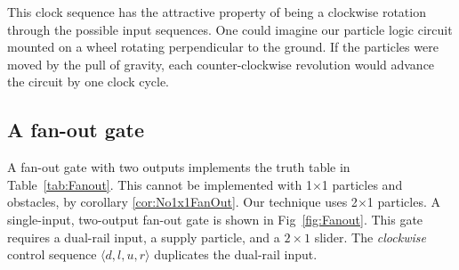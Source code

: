 \documentclass[letterpaper, 10 pt, conference]{ieeeconf}
\begin{document}
  

This clock sequence has the attractive property of being a clockwise rotation through the possible input sequences.  One could imagine our particle logic circuit mounted on a wheel rotating perpendicular to the ground. If the particles were moved by the pull of gravity, each counter-clockwise revolution would advance the circuit by one clock cycle.

\subsection{A {\sc fan-out} gate}\label{sec:FanOut}
A {\sc fan-out} gate with two outputs implements the truth table in Table~\ref{tab:Fanout}.  
This cannot be implemented with 1$\times$1 particles and obstacles, by corollary \ref{cor:No1x1FanOut}.   Our technique uses 2$\times$1 particles.   A single-input, two-output {\sc fan-out} gate is shown in Fig~\ref{fig:Fanout}.  This gate requires a dual-rail input, a supply particle, and a $2\times 1$ slider.  The  \emph{clockwise} control sequence $\langle d,l,u,r \rangle$  duplicates the dual-rail input.
\end{document}
